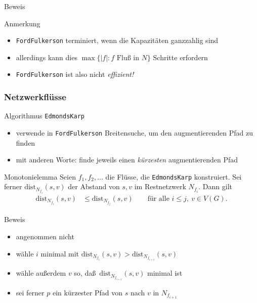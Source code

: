 \documentclass[aspectratio=1610, 11pt]{beamer}
\newcommand\dist{\mathrm{dist}}
\newcommand{\mytitle}{Netzwerkfl\"usse}
\begin{document}
\begin{frame}
\begin{overprint}
\begin{exampleblock}{Beweis}
		\end{exampleblock}
		\begin{exampleblock}{Anmerkung}
			\begin{itemize}
				\item {\tt FordFulkerson} terminiert, wenn die Kapazit\"aten ganzzahlig sind
				\item allerdings kann dies $\max\{|f|:f\mbox{ Flu\ss\ in }N\}$ Schritte erfordern
				\item {\tt FordFulkerson} ist also nicht \emph{effizient!}
			\end{itemize}
		\end{exampleblock}
	\end{overprint}
\end{frame}

\begin{frame}\frametitle{\mytitle}
	\begin{overprint}
		\begin{exampleblock}{Algorithmus {\tt EdmondsKarp}}
			\begin{itemize}
				\item verwende in {\tt FordFulkerson} Breitensuche, um den augmentierenden Pfad zu finden
				\item mit anderen Worte: finde jeweils einen \emph{k\"urzesten} augmentierenden Pfad
			\end{itemize}
		\end{exampleblock}
		\begin{block}{Monotonielemma}
			Seien $f_1,f_2,\ldots$ die Fl\"usse, die {\tt EdmondsKarp} konstruiert.
			Sei ferner $\dist_{N_{f_i}}(s,v)$ der Abstand von $s,v$ im Restnetzwerk $N_{f_i}$.
			Dann gilt 
			\begin{align*}
				\dist_{N_{f_i}}(s,v)&\leq\dist_{N_{f_j}}(s,v)\qquad\mbox{f\"ur alle }i\leq j,\ v\in V(G).
			\end{align*}
		\end{block}
		\begin{exampleblock}{Beweis}
			\begin{itemize}
				\item angenommen nicht
				\item w\"ahle $i$ minimal mit $\dist_{N_{f_i}}(s,v)>\dist_{N_{f_{i+1}}}(s,v)$
				\item w\"ahle au\ss erdem $v$ so, da\ss\ $\dist_{N_{f_{i+1}}}(s,v)$ minimal ist
				\item sei ferner $p$ ein k\"urzester Pfad von $s$ nach $v$ in $N_{f_{i+1}}$
			\end{itemize}

\end{exampleblock}
\end{overprint}
\end{frame}
\end{document}
